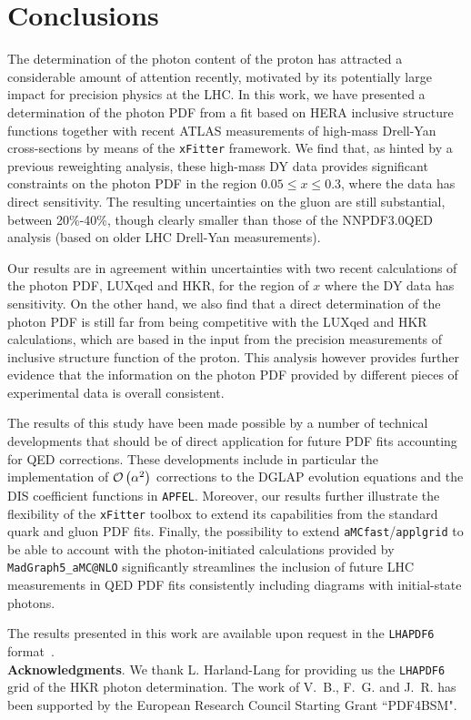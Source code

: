 \section{Conclusions}

\label{sec:conclusions}

The determination of the photon content of the proton has
attracted a considerable amount of attention recently, motivated by
its potentially large impact for precision physics at the LHC.
%
In this work, we have presented a determination of the photon PDF from
a fit based on HERA inclusive structure functions together with
recent ATLAS measurements
of high-mass Drell-Yan cross-sections by means of the
{\tt xFitter} framework.
%
We find that, as hinted by a previous reweighting
analysis, these high-mass DY data provides significant constraints on the photon PDF
in the region $0.05 \le x \le 0.3$, where the data has direct
sensitivity.
%
The resulting uncertainties on the gluon are still substantial,
between 20\%-40\%, though clearly smaller than those of the
NNPDF3.0QED analysis (based on older LHC Drell-Yan measurements).

Our results are in agreement within uncertainties with two
recent calculations of the photon PDF,
LUXqed and HKR, for the region of $x$ where the DY data has sensitivity.
%
On the other hand, we also find that a direct determination of the photon PDF
is still far from being competitive with the LUXqed and HKR calculations,
which are based in the input from the
precision measurements of inclusive structure function of the proton.
%
This analysis however provides further evidence that the information
on the photon PDF provided by different pieces of experimental data
is overall consistent.

The results of this study have been made possible by a number of technical developments
that should be of direct application for future PDF fits accounting for QED corrections.
%
These developments include  in particular
the implementation of $\mathcal{O}\left( \alpha^2\right)$ corrections to the DGLAP
evolution equations
and the DIS coefficient functions in {\tt APFEL}.
%
Moreover, our results further
illustrate the flexibility of the {\tt xFitter} toolbox to extend
its capabilities from the standard quark and gluon PDF fits.
%
Finally, the possibility to extend
{\tt aMCfast}/{\tt applgrid}
to be able to account with the photon-initiated calculations provided
by {\tt MadGraph5\_aMC@NLO} significantly streamlines the inclusion
of future LHC measurements in QED PDF fits consistently including
diagrams with initial-state photons.

The results presented in this work are available upon
request in the {\tt LHAPDF6} format~\cite{Buckley:2014ana}.\\

{\bf Acknowledgments}.
%
We thank L. Harland-Lang for providing us the {\tt LHAPDF6} grid
of the HKR photon determination.
%
The work of V.~B., F.~G. and J.~R. has been supported
by the European Research Council Starting Grant ``PDF4BSM".



